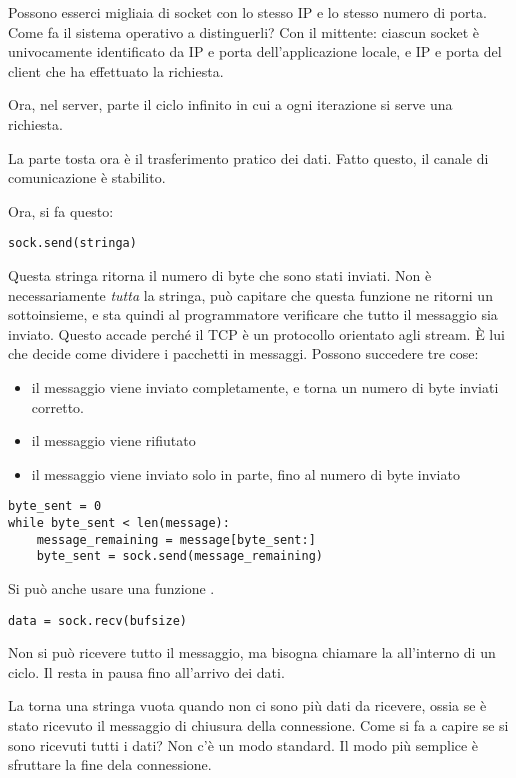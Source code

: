 Possono esserci migliaia di socket con lo stesso IP e lo stesso numero di porta. Come fa il sistema operativo a distinguerli? Con il mittente: ciascun socket \`e univocamente identificato da IP e porta dell'applicazione locale, e IP e porta del client che ha effettuato la richiesta.

Ora, nel server, parte il ciclo infinito in cui a ogni iterazione si serve una richiesta.

La parte tosta ora \`e il trasferimento pratico dei dati. Fatto questo, il canale di comunicazione \`e stabilito.

Ora, si fa questo:

\begin{verbatim}
sock.send(stringa)
\end{verbatim}

Questa stringa ritorna il numero di byte che sono stati inviati. Non \`e necessariamente \emph{tutta} la stringa, pu\`o capitare che questa funzione ne ritorni un sottoinsieme, e sta quindi al programmatore verificare che tutto il messaggio sia inviato. Questo accade perch\'e il TCP \`e un protocollo orientato agli stream. \`E lui che decide come dividere i pacchetti in messaggi. Possono succedere tre cose:
\begin{itemize}
    \item il messaggio viene inviato completamente, e torna un numero di byte inviati corretto.
    \item il messaggio viene rifiutato
    \item il messaggio viene inviato solo in parte, fino al numero di byte inviato
\end{itemize}

\begin{verbatim}
byte_sent = 0
while byte_sent < len(message):
    message_remaining = message[byte_sent:]
    byte_sent = sock.send(message_remaining)
\end{verbatim}

Si pu\`o anche usare una funzione .

\begin{verbatim}
data = sock.recv(bufsize)
\end{verbatim}

Non si pu\`o ricevere tutto il messaggio, ma bisogna chiamare la  all'interno di un ciclo. Il  resta in pausa fino all'arrivo dei dati.

La  torna una stringa vuota quando non ci sono pi\`u dati da ricevere, ossia se \`e stato ricevuto il messaggio di chiusura della connessione. Come si fa a capire se si sono ricevuti tutti i dati? Non c'\`e un modo standard. Il modo pi\`u semplice \`e sfruttare la fine dela connessione.

